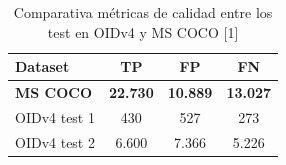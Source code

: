 \begin{table}[ht]
\centering
\caption{Comparativa métricas de calidad entre los test en OIDv4 y MS COCO [1]}
\label{tab:comparativa-metricas1}
\begin{tabular}{lccc}
\hline
\textbf{Dataset}                   & \textbf{TP}          & \textbf{FP}          & \textbf{FN}          \\ \hline
\textbf{MS COCO}              & \textbf{22.730}      & \textbf{10.889}      & \textbf{13.027}      \\
OIDv4 test 1                       & 430                  & 527                  & 273                \\
OIDv4 test 2                       & 6.600                & 7.366                & 5.226                \\ \hline
\end{tabular}
\end{table}

